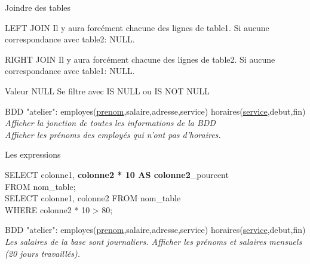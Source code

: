 \documentclass[xetex,dvipsnames]{beamer}
\begin{document}
\begin{frame}[t]{Joindre des tables}

	\begin{alertblock}{LEFT JOIN}
		Il y aura forcément chacune des lignes de table1. Si aucune correspondance avec table2: NULL.
	\end{alertblock}
	\begin{alertblock}{RIGHT JOIN}
		Il y aura forcément chacune des lignes de table2. Si aucune correspondance avec table1: NULL.
	\end{alertblock}
\begin{footnotesize}
	\begin{block}{Valeur NULL}
		Se filtre avec IS NULL ou IS NOT NULL
	\end{block}
\end{footnotesize}

\begin{scriptsize}
		\vspace{1em}
		BDD "atelier": employes(\underline{prenom},salaire,adresse,service) horaires(\underline{service},debut,fin)\\
		\vspace{0.5em}
		\textit{Afficher la jonction de toutes les informations de la BDD}\\
		\textit{Afficher les prénoms des employés qui n'ont pas d'horaires.}\\
\end{scriptsize}

\end{frame}

\begin{frame}[t]{Les expressions}

	\begin{alertblock}{}
	SELECT colonne1, \textbf{colonne2  * 10 AS colonne2}\_pourcent \\FROM nom\_table;\\
	SELECT colonne1, colonne2 FROM nom\_table \\WHERE colonne2 * 10 > 80;
	\end{alertblock}

\begin{scriptsize}
	\vspace{1em}
	BDD "atelier": employes(\underline{prenom},salaire,adresse,service) horaires(\underline{service},debut,fin)\\
	\vspace{0.5em}
	\textit{Les salaires de la base sont journaliers. Afficher les prénoms et salaires mensuels (20 jours travaillés).}
\end{scriptsize}
	
\end{frame}
\end{document}
